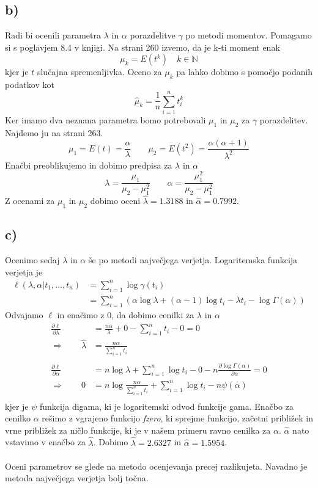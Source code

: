 \documentclass[A4paper, 11pt]{article}
\begin{document}
\subsection*{b)}
Radi bi ocenili parametra $\lambda$ in $\alpha$  porazdelitve $\gamma$ po metodi momentov. Pomagamo si s poglavjem 8.4 v knjigi. Na strani 260 izvemo, da je k-ti moment enak
\[ \mu_k = E(t^k) \quad k \in \mathbb{N} \]
kjer je $t$ slučajna spremenljivka. Oceno za $\mu_k$ pa lahko dobimo s pomočjo podanih podatkov kot
\[ \hat{\mu}_k = \frac{1}{n} \sum_{i=1}^{n} t_i^k \]
Ker imamo dva neznana parametra bomo potrebovali $\mu_1$ in $\mu_2$ za $\gamma$ porazdelitev. Najdemo ju na strani 263.
\[ \mu_1 = E(t) = \frac{\alpha}{\lambda} \qquad \mu_2 = E(t^2) = \frac{\alpha (\alpha + 1)}{\lambda^2} \]
Enačbi preoblikujemo in dobimo predpisa za $\lambda$ in $\alpha$
\[ \lambda = \frac{\mu_1}{\mu_2 - \mu_1^2} \qquad \alpha = \frac{\mu_1^2}{\mu_2 - \mu_1^2} \]
Z ocenami za $\mu_1$ in $\mu_2$ dobimo oceni $\hat{\lambda} = 1.3188$ in $\hat{\alpha} = 0.7992$. 


\subsection*{c)}
Ocenimo sedaj  $\lambda$ in $\alpha$ še po metodi največjega verjetja. Logaritemska funkcija verjetja je 
\[
\begin{split}
\ell (\lambda, \alpha | t_1, \ldots, t_n) & = \sum_{i=1}^{n} \log{\gamma(t_i)} \\
                                                              & = \sum_{i=1}^{n} (\alpha \log{\lambda} + (\alpha - 1) \log{t_i} - \lambda t_i - \log{\Gamma (\alpha)})
\end{split}
\]
Odvajamo $\ell$ in enačimo z 0, da dobimo cenilki za $\lambda$ in $\alpha$
\[
\begin{split}
\frac{\partial \ell}{\partial \lambda} & = \frac{n \alpha}{\lambda} + 0 - \sum_{i=1}^{n} t_i - 0 = 0 \\
\Rightarrow \qquad \hat{\lambda} & = \frac{n \alpha}{\sum_{i=1}^{n} t_i} \\
\\
\frac{\partial \ell}{\partial \alpha} & = n \log{\lambda} + \sum_{i=1}^{n} \log{t_i} - 0 - n \frac{\partial \log{\Gamma (\alpha)}}{\partial \alpha} = 0 \\
\Rightarrow \qquad 0 & =  n \log{\frac{n \alpha}{\sum_{i=1}^{n} t_i}} + \sum_{i=1}^{n} \log{t_i} - n \psi(\alpha) \\
\end{split}
\]
kjer je $\psi$ funkcija digama, ki je logaritemski odvod funkcije gama. Enačbo za cenilko $\alpha$ rešimo z vgrajeno funkcijo \textit{fzero}, ki sprejme funkcijo, začetni približek in vrne približek za ničlo funkcije, ki je v našem primeru ravno cenilka za $\alpha$. $\hat{\alpha}$ nato vstavimo v enačbo za $\hat{\lambda}$. Dobimo $\hat{\lambda} = 2.6327$ in $\hat{\alpha} = 1.5954$. \\
\\
Oceni parametrov se glede na metodo ocenjevanja precej razlikujeta. Navadno je metoda največjega verjetja bolj točna.
\end{document}
